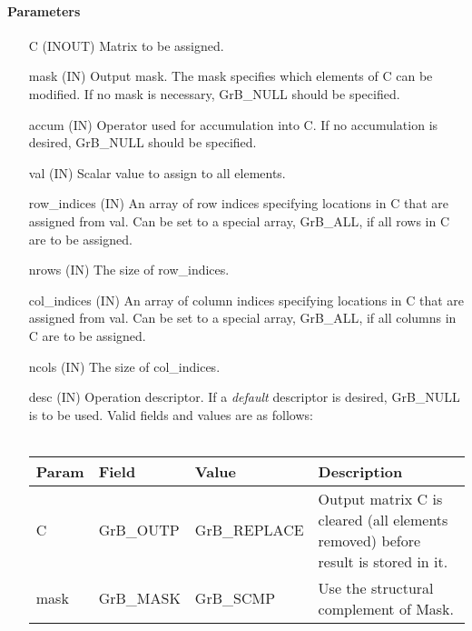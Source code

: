 \paragraph{Parameters}

\begin{itemize}[leftmargin=1.1in]
    \item[{\sf C}]    ({\sf INOUT}) Matrix to be assigned.

    \item[{\sf mask}] ({\sf IN}) Output mask. The mask specifies which elements
    of {\sf C} can be modified. If no mask is necessary, {\sf GrB\_NULL} should 
    be specified.

    \item[{\sf accum}] ({\sf IN}) Operator used for accumulation into {\sf C}.  
    If no accumulation
                        is desired, {\sf GrB\_NULL} should be specified.

    \item[{\sf val}]    ({\sf IN}) Scalar value to assign to all elements.
    \item[{\sf row\_indices}] ({\sf IN}) An array of row indices specifying locations 
                              in {\sf C} that are assigned from {\sf val}. Can be set
                              to a special array, {\sf GrB\_ALL}, if all rows
                              in {\sf C} are to be assigned.
    \item[{\sf nrows}]  ({\sf IN}) The size of {\sf row\_indices}.
    \item[{\sf col\_indices}] ({\sf IN}) An array of column indices specifying locations
                              in {\sf C} that are assigned from {\sf val}. Can be set
                              to a special array, {\sf GrB\_ALL}, if all columns
                              in {\sf C} are to be assigned.
    \item[{\sf ncols}]  ({\sf IN}) The size of {\sf col\_indices}.


    \item[{\sf desc}]   ({\sf IN}) Operation descriptor. If a
    \emph{default} descriptor is desired, {\sf GrB\_NULL} is to be
    used. Valid fields and values are as follows: \\ ~\\
    \begin{tabular}{lllp{2.5in}}
    Param & Field  & Value & Description \\
    \hline
    {\sf C}    & {\sf GrB\_OUTP} & {\sf GrB\_REPLACE} & Output matrix {\sf C} is cleared (all elements removed) before result is stored in it.\\
    {\sf mask} & {\sf GrB\_MASK} & {\sf GrB\_SCMP} & Use the structural complement of {\sf Mask}. \\
    \end{tabular}

\end{itemize}

